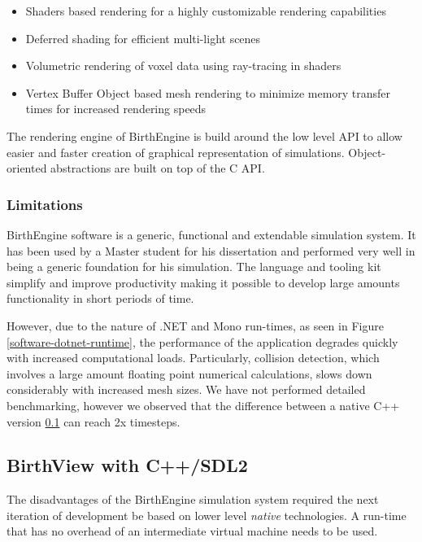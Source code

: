     \begin{itemize}
      \item Shaders based rendering for a highly customizable rendering capabilities
      \item Deferred shading for efficient multi-light scenes
      \item Volumetric rendering of voxel data using ray-tracing in shaders
      \item Vertex Buffer Object based mesh rendering to minimize memory transfer times for increased rendering speeds
    \end{itemize}

    The rendering engine of BirthEngine is build around the low level API to allow easier and faster creation of graphical representation of simulations. Object-oriented abstractions are built on top of the C API.

  \subsubsection{Limitations}

  BirthEngine software is a generic, functional and extendable simulation system. It has been used by a Master student for his dissertation and performed very well in being a generic foundation for his simulation. The language and tooling kit simplify and improve productivity making it possible to develop large amounts functionality in short periods of time.

  However, due to the nature of .NET and Mono run-times, as seen in Figure \ref{software-dotnet-runtime}, the performance of the application degrades quickly with increased computational loads. Particularly, collision detection, which involves a large amount floating point numerical calculations, slows down considerably with increased mesh sizes. We have not performed detailed benchmarking, however we observed that the difference between a native C++ version \ref{birthview} can reach 2x timesteps.

\subsection{BirthView with C++/SDL2} \label{birthview}

The disadvantages of the BirthEngine simulation system required the next iteration of development be based on lower level \textit{native} technologies. A run-time that has no overhead of an intermediate virtual machine needs to be used.

